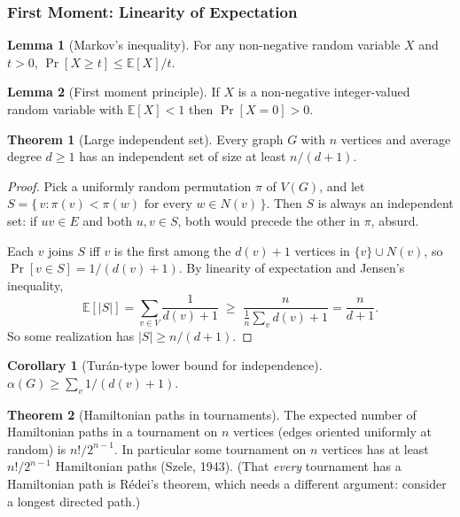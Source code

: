 \documentclass{article}
\theoremstyle{definition}
\newtheorem{theorem}{Theorem}
\newtheorem{lemma}{Lemma}
\newtheorem{corollary}{Corollary}
\begin{document}
\subsubsection{First Moment: Linearity of Expectation}

\begin{lemma}[Markov's inequality]\label{lem:markov}
For any non-negative random variable $X$ and $t > 0$,
$\Pr[X \ge t] \le \mathbb{E}[X]/t$.
\end{lemma}

\begin{lemma}[First moment principle]
If $X$ is a non-negative integer-valued random variable with
$\mathbb{E}[X] < 1$ then $\Pr[X = 0] > 0$.
\end{lemma}

\begin{theorem}[Large independent set]\label{thm:largeind}
Every graph $G$ with $n$ vertices and average degree $d \ge 1$ has an
independent set of size at least $n/(d + 1)$.
\end{theorem}

\begin{proof}
Pick a uniformly random permutation $\pi$ of $V(G)$, and let
$S = \{\, v : \pi(v) < \pi(w) \text{ for every } w \in N(v) \,\}$.
Then $S$ is always an independent set: if $uv \in E$ and both
$u, v \in S$, both would precede the other in $\pi$, absurd.

Each $v$ joins $S$ iff $v$ is the first among the $d(v) + 1$ vertices
in $\{v\} \cup N(v)$, so $\Pr[v \in S] = 1/(d(v) + 1)$. By linearity
of expectation and Jensen's inequality,
\[
  \mathbb{E}[|S|] = \sum_{v \in V} \frac{1}{d(v) + 1}
  \;\ge\; \frac{n}{\frac{1}{n}\sum_v d(v) + 1} = \frac{n}{d + 1}.
\]
So some realization has $|S| \ge n/(d + 1)$.
\end{proof}

\begin{corollary}[Tur\'an-type lower bound for independence]
$\alpha(G) \ge \sum_v 1/(d(v) + 1)$.
\end{corollary}

\begin{theorem}[Hamiltonian paths in tournaments]
The expected number of Hamiltonian paths in a tournament on $n$
vertices (edges oriented uniformly at random) is $n!/2^{n - 1}$. In
particular some tournament on $n$ vertices has at least $n!/2^{n-1}$
Hamiltonian paths (Szele, 1943). (That \emph{every} tournament has a
Hamiltonian path is R\'edei's theorem, which needs a different argument:
consider a longest directed path.)
\end{theorem}
\end{document}
